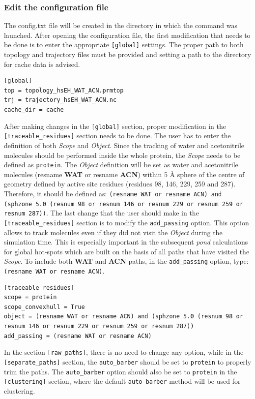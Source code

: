 \documentclass[9pt,tutorial]{livecoms}
\begin{document}
\subsubsection{Edit the configuration file}
The config.txt file will be created in the directory in which the command was launched. After opening the configuration file, the first modification that needs to be done is to enter the appropriate \texttt{[global]} settings. The proper path to both topology and trajectory files must be provided and setting a path to the directory for cache data is advised. 
\begin{lstlisting}
[global]
top = topology_hsEH_WAT_ACN.prmtop
trj = trajectory_hsEH_WAT_ACN.nc
cache_dir = cache
\end{lstlisting}
After making changes in the \texttt{[global]} section, proper modification in the \texttt{[traceable\_residues]} section needs to be done. The user has to enter the definition of both \emph{Scope} and \emph{Object}. Since the tracking of water and acetonitrile molecules should be performed inside the whole protein, the \textit{Scope} needs to be defined as \texttt{protein}. The \emph{Object} definition will be set as water and acetonitrile molecules (resname \textbf{WAT} or resname \textbf{ACN}) within 5 Å sphere of the centre of geometry defined by active site residues (residues 98, 146, 229, 259 and 287). Therefore, it should be defined as: \texttt{(resname WAT or resname ACN) and (sphzone 5.0 (resnum 98 or resnum 146 or resnum 229 or resnum 259 or resnum 287))}. The last change that the user should make in the \texttt{[traceable\_residues]} section is to modify the \texttt{add\_passing} option. This option allows to track molecules even if they did not visit the \emph{Object} during the simulation time. This is especially important in the subsequent \emph{pond} calculations for global hot-spots which are built on the basis of all paths that have visited the \emph{Scope}. To include both \textbf{WAT} and \textbf{ACN} paths, in the \texttt{add\_passing} option, type: \texttt{(resname WAT or resname ACN)}.
\begin{lstlisting}
[traceable_residues]
scope = protein
scope_convexhull = True
object = (resname WAT or resname ACN) and (sphzone 5.0 (resnum 98 or resnum 146 or resnum 229 or resnum 259 or resnum 287))
add_passing = (resname WAT or resname ACN)
\end{lstlisting}
In the section \texttt{[raw\_paths]}, there is no need to change any option, while in the \texttt{[separate\_paths]} section, the \texttt{auto\_barber} should be set to \texttt{protein} to properly trim the paths. The \texttt{auto\_barber} option should also be set to \texttt{protein} in the \texttt{[clustering]} section, where the default \texttt{auto\_barber} method will be used for clustering. 
\end{document}
